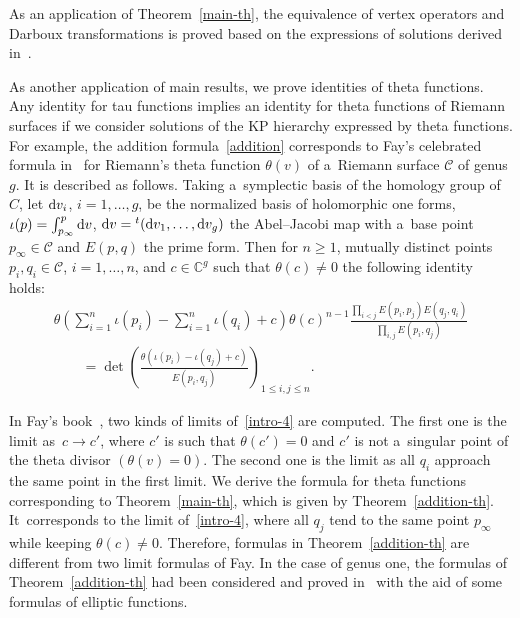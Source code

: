 \documentclass[10pt,a4paper]{amsart}
\numberwithin{equation}{section}
\theoremstyle{definition}
\begin{document}
As an application of Theorem~\ref{main-th}, the equivalence of vertex operators and Darboux transformations is
proved based on the expressions of solutions derived in~\cite{Kakei,Nak2021,Nak2024}.

As another application of main results, we prove identities of theta functions.
Any identity for tau functions implies an identity for theta functions of Riemann surfaces if we consider solutions of the KP hierarchy expressed by theta functions.
For example, the addition formula~\eqref{addition} corresponds
to Fay's celebrated formula in~\cite[equation~(43)]{Fay1973} for
 Riemann's theta function $\theta(v)$ of a~Riemann surface ${\mathcal C}$ of genus $g$. It is described as follows. Taking a~symplectic basis of the homology group of $C$, let ${\rm d}v_i$, $i=1,\dots ,g$, be the normalized basis of holomorphic one forms,
$
\iota(p)=\int_{p_\infty}^{p}{\rm d}v$, $
{\rm d}v={}^t({\rm d}v_1,\dots ,{\rm d}v_g)
$
 the Abel--Jacobi map with a~base point $p_\infty\in {\mathcal C}$ and $E(p,q)$ the prime form.
Then for $n \geq 1$, mutually distinct points $p_i, q_i\in {\mathcal C}$, $i=1,\dots ,n$, and
 $c\in {\mathbb C}^g$ such that $\theta(c)\neq 0$ the following identity holds:
\begin{gather}
\theta\left(\sum_{i=1}^n\iota(p_i)-\sum_{i=1}^n \iota(q_i)+c\right)\theta(c)^{n-1}
\frac{\prod_{i<j}E(p_i,p_j)E(q_j,q_i)}{\prod_{i,j}E(p_i,q_j)}
\nonumber
\\
\qquad=\det\left(\frac{\theta(\iota(p_i)-\iota(q_j)+c)}{E(p_i,q_j)}\right)_{1\leq i,j\leq n}.
\label{intro-4}
\end{gather}

In Fay's book~\cite{Fay1973},
two kinds of limits of~\eqref{intro-4} are computed. The first one is the limit as~${c \to c'}$, where $c'$ is such that $\theta(c')=0$ and $c'$ is not a~singular point of the theta divisor $(\theta(v)=0)$.
The second one is the limit as all $q_i$ approach the same point in the first limit.
We derive the formula for theta functions
 corresponding to Theorem~\ref{main-th}, which is given by Theorem~\ref{addition-th}.
 It~corresponds to the limit of~\eqref{intro-4}, where all $q_j$ tend to the same point $p_\infty$ while keeping $\theta(c)\neq 0$. Therefore, formulas in Theorem~\ref{addition-th} are
 different from two limit formulas of Fay.
 In the case of genus one, the formulas of Theorem~\ref{addition-th} had been considered and
 proved in~\cite{Li-Zhang2022} with the aid of some formulas of elliptic functions.
\end{document}

